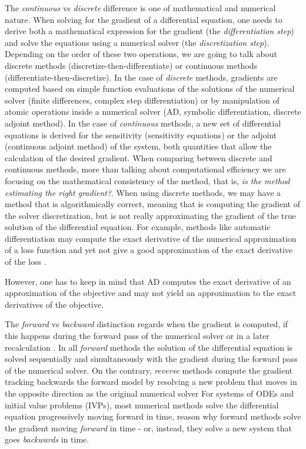 The \textit{continuous} vs \textit{discrete} difference is one of mathematical and numerical nature. 
When solving for the gradient of a differential equation, one needs to derive both a mathematical expression for the gradient (the \textit{differentiation step}) and solve the equations using a numerical solver (the \textit{discretization step})\cite{bradley2013pde, Onken_Ruthotto_2020, FATODE2014, Sirkes_Tziperman_1997}. 
Depending on the order of these two operations, we are going to talk about discrete methods (discretize-then-differentiate) or continuous methods (differentiate-then-discretize). 
In the case of \textit{discrete} methods, gradients are computed based on simple function evaluations of the solutions of the numerical solver (finite differences, complex step differentiation) or by manipulation of atomic operations inside a numerical solver (AD, symbolic differentiation, discrete adjoint method). 
In the case of \textit{continuous} methods, a new set of differential equations is derived for the sensitivity (sensitivity equations) or the adjoint (continuous adjoint method) of the system, both quantities that allow the calculation of the desired gradient.   
When comparing between discrete and continuous methods, more than talking about computational efficiency we are focusing on the mathematical consistency of the method, that is, \textit{is the method estimating the right gradient?}. 
When using discrete methods, we may have a method that is algorithmically correct, meaning that is computing the gradient of the solver discretization, but is not really approximating the gradient of the true solution of the differential equation. 
For example, methods like automatic differentiation may compute the exact derivative of the numerical approximation of a loss function and yet not give a good approximation of the exact derivative of the loss \cite{Walther_2007}.

However, one has to keep in mind that AD computes the exact derivative of an approximation of the objective and may not yield an approximation to the exact derivatives of the objective.

The \textit{forward} vs \textit{backward} distinction regards when the gradient is computed, if this happens during the forward pass of the numerical solver or in a later recalculation \cite{Griewank:2008kh}. 
In all \textit{forward} methods the solution of the differential equation is solved sequentially and simultaneously with the gradient during the forward pass of the numerical solver.  
On the contrary, \textit{reverse} methods compute the gradient tracking backwards the forward model by resolving a new problem that moves in the opposite direction as the original numerical solver 
For systems of ODEs and initial value problems (IVPs), most numerical methods solve the differential equation progressively moving forward in time, reason why forward methods solve the gradient moving \textit{forward} in time - or, instead, they solve a new system that goes \textit{backwards} in time.

